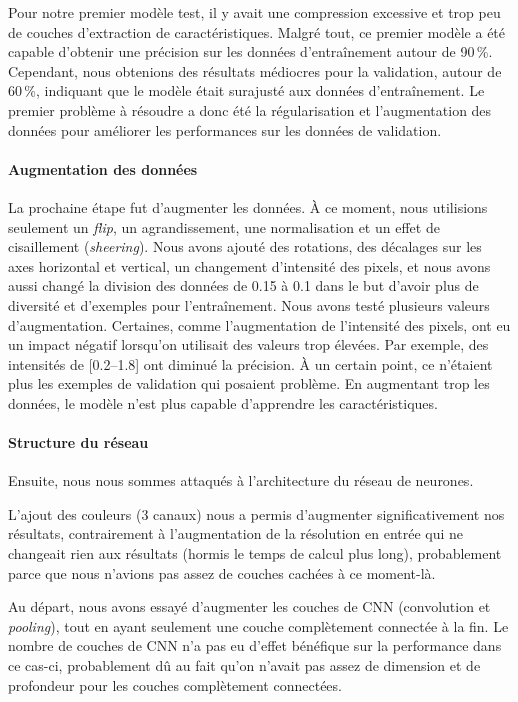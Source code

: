 \documentclass{article}
\begin{document}
Pour notre premier modèle test, il y avait une compression excessive et trop peu de couches d’extraction de caractéristiques. Malgré tout, ce premier modèle a été capable d’obtenir une précision sur les données d’entraînement autour de 90\,\%. Cependant, nous obtenions des résultats médiocres pour la validation, autour de 60\,\%, indiquant que le modèle était surajusté aux données d’entraînement. Le premier problème à résoudre a donc été la régularisation et l’augmentation des données pour améliorer les performances sur les données de validation.

\paragraph{Augmentation des données}

La prochaine étape fut d’augmenter les données. À ce moment, nous utilisions seulement un \emph{flip}, un agrandissement, une normalisation et un effet de cisaillement (\emph{sheering}). Nous avons ajouté des rotations, des décalages sur les axes horizontal et vertical, un changement d’intensité des pixels, et nous avons aussi changé la division des données de 0.15 à 0.1 dans le but d’avoir plus de diversité et d’exemples pour l’entraînement. Nous avons testé plusieurs valeurs d’augmentation. Certaines, comme l’augmentation de l’intensité des pixels, ont eu un impact négatif lorsqu’on utilisait des valeurs trop élevées. Par exemple, des intensités de [0.2--1.8] ont diminué la précision. À un certain point, ce n’étaient plus les exemples de validation qui posaient problème. En augmentant trop les données, le modèle n’est plus capable d’apprendre les caractéristiques.

\paragraph{Structure du réseau}

Ensuite, nous nous sommes attaqués à l'architecture du réseau de neurones.

L'ajout des couleurs (3 canaux) nous a permis d'augmenter significativement nos résultats, contrairement à l'augmentation de la résolution en entrée qui ne changeait rien aux résultats (hormis le temps de calcul plus long), probablement parce que nous n'avions pas assez de couches cachées à ce moment-là.

Au départ, nous avons essayé d'augmenter les couches de CNN (convolution et \emph{pooling}), tout en ayant seulement une couche complètement connectée à la fin. Le nombre de couches de CNN n'a pas eu d'effet bénéfique sur la performance dans ce cas-ci, probablement dû au fait qu'on n'avait pas assez de dimension et de profondeur pour les couches complètement connectées.
\end{document}
